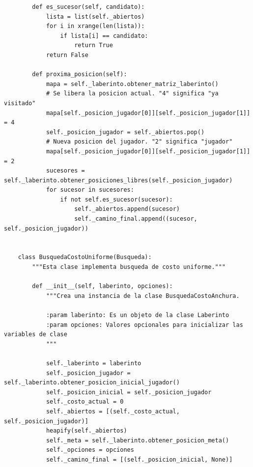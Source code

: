\documentclass[letter, titlepage, 10pt]{article}
\begin{document}
\begin{lstlisting}
        def es_sucesor(self, candidato):
            lista = list(self._abiertos)
            for i in xrange(len(lista)):
                if lista[i] == candidato:
                    return True
            return False
    
        def proxima_posicion(self):
            mapa = self._laberinto.obtener_matriz_laberinto()
            # Se libera la posicion actual. "4" significa "ya visitado"
            mapa[self._posicion_jugador[0]][self._posicion_jugador[1]] = 4
            self._posicion_jugador = self._abiertos.pop()
            # Nueva posicion del jugador. "2" significa "jugador"
            mapa[self._posicion_jugador[0]][self._posicion_jugador[1]] = 2
            sucesores = self._laberinto.obtener_posiciones_libres(self._posicion_jugador)
            for sucesor in sucesores:
                if not self.es_sucesor(sucesor):
                    self._abiertos.append(sucesor)
                    self._camino_final.append((sucesor, self._posicion_jugador))
    
    
    class BusquedaCostoUniforme(Busqueda):
        """Esta clase implementa busqueda de costo uniforme."""
    
        def __init__(self, laberinto, opciones):
            """Crea una instancia de la clase BusquedaCostoAnchura.
            
            :param laberinto: Es un objeto de la clase Laberinto
            :param opciones: Valores opcionales para inicializar las variables de clase
            """
    
            self._laberinto = laberinto
            self._posicion_jugador = self._laberinto.obtener_posicion_inicial_jugador()
            self._posicion_inicial = self._posicion_jugador
            self._costo_actual = 0
            self._abiertos = [(self._costo_actual, self._posicion_jugador)]
            heapify(self._abiertos)
            self._meta = self._laberinto.obtener_posicion_meta()
            self._opciones = opciones
            self._camino_final = [(self._posicion_inicial, None)]
        

\end{lstlisting}
\end{document}
